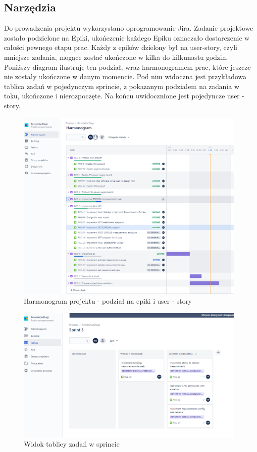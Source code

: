 \documentclass[10pt,a4paper]{article}
\begin{document}
		\subsection{Narzędzia}
		Do prowadzenia projektu wykorzystano oprogramowanie Jira. Zadanie projektowe zostało podzielone na Epiki, ukończenie każdego Epiku oznaczało dostarczenie w całości pewnego etapu prac. Każdy z epików dzielony był na user-story, czyli mniejsze zadania, mogące zostać ukończone w kilka do kilkunastu godzin. Poniższy diagram ilustruje ten podział, wraz harmonogramem prac, które jeszcze nie zostały ukończone w danym momencie. Pod nim widoczna jest przykładowa tablica zadań w pojedynczym sprincie, z pokazanym podziałem na zadania w toku, ukończone i nierozpoczęte. Na końcu uwidocznione jest pojedyncze user - story.
				
		\begin{figure}[H]
			\centering
			\includegraphics[width=0.9\linewidth]{harmonogram}
			\caption[Harmonogram projektu]{Harmonogram projektu - podział na epiki i user - story}
			\label{fig:harmonogram}
		\end{figure}
		
		\begin{figure}[H]
			\centering
			\includegraphics[width=0.9\linewidth]{sprint}
			\caption[Widok tablicy zadań]{Widok tablicy zadań w sprincie}
			\label{fig:sprint}
		\end{figure}
		
\end{document}
